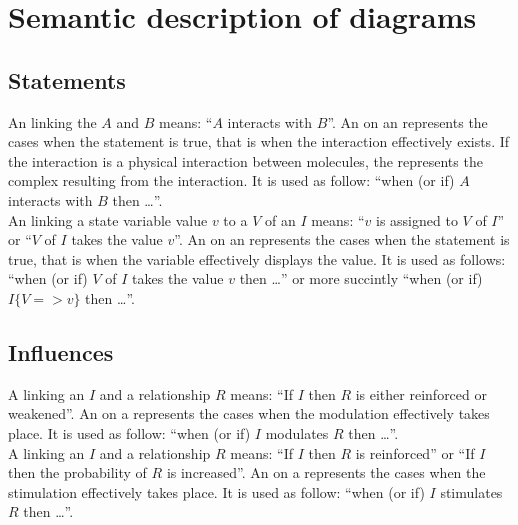 \color{red}
\section{Semantic description of \ER{} diagrams}

\subsection{Statements}

An  linking the  $A$ and $B$ means: ``$A$ interacts with $B$''. An  on an  represents the cases when the statement is true, that is when the interaction effectively exists. If the interaction is a physical interaction between molecules, the  represents the complex resulting from the interaction. It is used as follow: ``when (or if) $A$ interacts with $B$ then \ldots''.\\[\baselineskip]

\noindent
An  linking a state variable value $v$ to a  $V$ of an  $I$ means: ``$v$ is assigned to $V$ of $I$'' or ``$V$ of $I$ takes the value $v$''. An on an  represents the cases when the statement is true, that is when the variable effectively displays the value. It is used as follows: ``when (or if) $V$ of $I$ takes the value $v$ then \ldots'' or more succintly ``when (or if) $I\{V => v\}$ then \ldots''.\\[\baselineskip]

\subsection{Influences}

A  linking an  $I$ and a relationship $R$ means: ``If $I$ then $R$ is either reinforced or weakened''. An  on a  represents the cases when the modulation effectively takes place. It is used as follow: ``when (or if) $I$ modulates $R$ then \ldots''.\\[\baselineskip]

\noindent
A  linking an  $I$ and a relationship $R$ means: ``If $I$ then $R$ is reinforced'' or ``If $I$ then the probability of $R$ is increased''. An  on a  represents the cases when the stimulation effectively takes place. It is used as follow: ``when (or if) $I$ stimulates $R$ then \ldots''.\\[\baselineskip]

